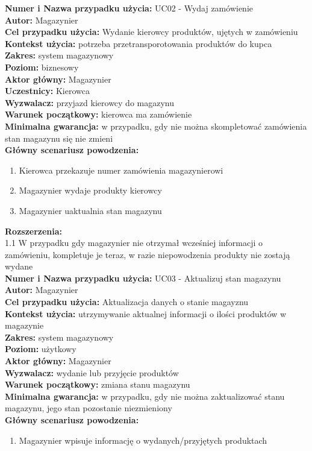 \textbf{Numer i Nazwa przypadku użycia:} UC02 - Wydaj zamówienie \\
\textbf{Autor:} Magazynier\\
\textbf{Cel przypadku użycia:} Wydanie kierowcy produktów, ujętych w zamówieniu \\
\textbf{Kontekst użycia:} potrzeba przetransporotowania produktów do kupca\\
\textbf{Zakres:} system magazynowy \\
\textbf{Poziom:} biznesowy \\
\textbf{Aktor główny:} Magazynier \\
\textbf{Uczestnicy:} Kierowca \\
\textbf{Wyzwalacz:} przyjazd kierowcy do magazynu \\
\textbf{Warunek początkowy:} kierowca ma zamówienie \\
\textbf{Minimalna gwarancja:} w przypadku, gdy nie można skompletować zamówienia stan magazynu się nie zmieni \\
\textbf{Główny scenariusz powodzenia:} 
	\begin{enumerate}
		\item Kierowca przekazuje numer zamówienia magazynierowi
		\item Magazynier wydaje produkty kierowcy
		\item Magazynier uaktualnia stan magazynu
	\end{enumerate}
\textbf{Rozszerzenia:} \\
1.1 W przypadku gdy magazynier nie otrzymał wcześniej informacji o zamówieniu, kompletuje je teraz, w razie niepowodzenia produkty nie zostają wydane\\

\textbf{Numer i Nazwa przypadku użycia:} UC03 - Aktualizuj stan magazynu \\
\textbf{Autor:} Magazynier\\
\textbf{Cel przypadku użycia:} Aktualizacja danych o stanie magayznu \\
\textbf{Kontekst użycia:} utrzymywanie aktualnej informacji o ilości produktów w magazynie \\
\textbf{Zakres:} system magazynowy \\
\textbf{Poziom:} użytkowy \\
\textbf{Aktor główny:} Magazynier \\
\textbf{Wyzwalacz:} wydanie lub przyjęcie produktów \\
\textbf{Warunek początkowy:} zmiana stanu magazynu \\
\textbf{Minimalna gwarancja:} w przypadku, gdy nie można zaktualizować stanu magazynu, jego stan pozostanie niezmieniony \\
\textbf{Główny scenariusz powodzenia:} 
	\begin{enumerate}
		\item Magazynier wpisuje informację o wydanych/przyjętych produktach
	\end{enumerate}

